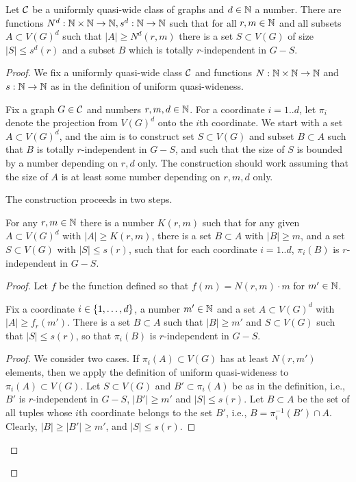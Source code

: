 \begin{proposition}\label{prop:uqw-tuples}
	Let $\cal C$ be a uniformly quasi-wide class of graphs and $d\in\N$ a number.
	There are functions $N^d:\N\times\N\to\N,s^d:\N\to \N$
	such that for all $r,m\in\N$ and all subsets $A\subset V(G)^d$
	such that $|A|\ge N^d(r,m)$ there  is a set $S\subset V(G)$
	of size $|S|\le s^d(r)$ and a subset $B$ which is totally $r$-independent in $G-S$.	
\end{proposition}
\begin{proof}We fix a uniformly quasi-wide class $\cal C$ and functions $N:\N\times\N\to \N$
	and $s:\N\to\N$ as in the definition of uniform quasi-wideness.
	
	Fix a graph $G\in \cal C$ and numbers $r,m,d\in\N$.
	For a coordinate $i=1..d$, let $\pi_i$ denote the projection from $V(G)^d$ onto the $i$th coordinate.
	We start with a set $A\subset V(G)^d$, and the aim is to construct 
	set $S\subset V(G)$ and  subset $B\subset A$ such that $B$ is totally $r$-independent in $G-S$, and such that the size of $S$ is bounded by a number depending on $r,d$ only. The construction 
	should work assuming that the size of $A$ is at least some number depending on $r,m,d$ only.
	
\medskip
	The construction proceeds in two steps.	


\begin{lemma}\label{lem:step1} For any $r,m\in \N$ there is a number $K(r,m)$ such that
	for any given $A\subset V(G)^d$ with $|A|\ge K(r,m)$,
	there is a set $B\subset A$ with $|B|\ge m$, and a set $S\subset V(G)$ with $|S|\le s(r)$, 
	such that for each coordinate $i=1..d$, 
 $\pi_i(B)$ is $r$-independent in $G-S$. 
\end{lemma}
\begin{proof}

Let $f$ be the function defined so that $f(m)=N(r,m)\cdot m$ for $m'\in\N$.

\begin{claim}\label{claim:ith-coord}
Fix a coordinate $i\in\set{1,\ldots,d}$, a number $m'\in\N$ and a  set $A\subset V(G)^d$ with  $|A|\ge f_r(m')$.
There is a set $B\subset A$ such that $|B|\ge m'$
and $S\subset V(G)$ such that $|S|\le s(r)$,
so that  $\pi_i(B)$ is $r$-independent in $G-S$.	
\end{claim}
\begin{proof}\label{pf:}
We consider two cases.
If $\pi_i(A)\subset V(G)$ has at least $N(r,m')$ elements, then we apply the definition of uniform quasi-wideness to $\pi_i(A)\subset V(G)$. Let $S\subset V(G)$ and $B'\subset \pi_i(A)$
be as in the definition, i.e., $B'$ is $r$-independent in $G-S$,
$|B'|\ge m'$ and $|S|\le s(r)$. Let $B\subset A$ be the set of all tuples 
whose $i$th coordinate belongs to the set $B'$, i.e., $B=\pi_i^{-1}(B')\cap A$.
Clearly, $|B|\ge |B'|\ge m'$, and $|S|\le s(r)$.


\end{proof}
\end{proof}
\end{proof}
